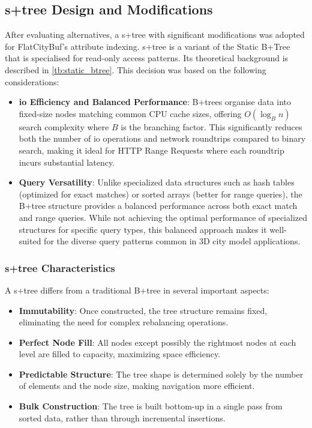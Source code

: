 \subsection{\texorpdfstring{\ac{s+tree}}{S+tree} Design and Modifications}
\label{methodology:attribute_index:static_btree_design}

After evaluating alternatives, a \ac{s+tree} with significant modifications was adopted for FlatCityBuf's attribute indexing. \ac{s+tree} is a variant of the Static B+Tree that is specialised for read-only access patterns. Its theoretical background is described in \autoref{tb:static_btree}. This decision was based on the following considerations:

\begin{itemize}
\item \textbf{\ac{io} Efficiency and Balanced Performance}: B+trees organise data into fixed-size nodes matching common CPU cache sizes, offering $O(\log_B n)$ search complexity where $B$ is the branching factor. This significantly reduces both the number of \ac{io} operations and network roundtrips compared to binary search, making it ideal for HTTP Range Requests where each roundtrip incurs substantial latency.

\item \textbf{Query Versatility}: Unlike specialized data structures such as hash tables (optimized for exact matches) or sorted arrays (better for range queries), the B+tree structure provides a balanced performance across both exact match and range queries. While not achieving the optimal performance of specialized structures for specific query types, this balanced approach makes it well-suited for the diverse query patterns common in 3D city model applications.
\end{itemize}

\subsubsection{\ac{s+tree} Characteristics}
\label{methodology:attribute_index:static_btree_characteristics}

A \ac{s+tree} differs from a traditional B+tree in several important aspects:

\begin{itemize}
\item \textbf{Immutability}: Once constructed, the tree structure remains fixed, eliminating the need for complex rebalancing operations.

\item \textbf{Perfect Node Fill}: All nodes except possibly the rightmost nodes at each level are filled to capacity, maximizing space efficiency.

\item \textbf{Predictable Structure}: The tree shape is determined solely by the number of elements and the node size, making navigation more efficient.

\item \textbf{Bulk Construction}: The tree is built bottom-up in a single pass from sorted data, rather than through incremental insertions.
\end{itemize}

